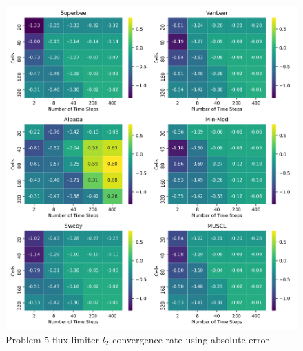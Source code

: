 \clearpage

\begin{figure}[p]
    \centering
    \includegraphics[width=6in]{images/chapter-5/problem5l2FluxLimiterConvergenceRate.png}
    \caption{Problem 5 flux limiter $l_{2}$ convergence rate using absolute error}
    \label{fig:problem5_l2error_fluxlimiter_convergence_rate}
\end{figure}
